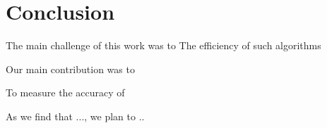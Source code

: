 \section{Conclusion} \label{sec:Conclusion}

The main challenge of this work was to
The efficiency of such algorithms

Our main contribution was to

To measure the accuracy of

As we find that ..., we plan to  ..







